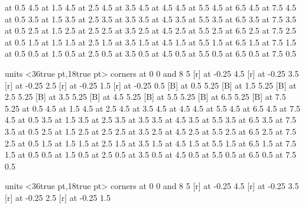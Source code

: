  at 0.5 4.5
 at 1.5 4.5
 at 2.5 4.5
 at 3.5 4.5
 at 4.5 4.5
 at 5.5 4.5
 at 6.5 4.5
 at 7.5 4.5
 at 0.5 3.5
 at 1.5 3.5
 at 2.5 3.5
 at 3.5 3.5
 at 4.5 3.5
 at 5.5 3.5
 at 6.5 3.5
 at 7.5 3.5
 at 0.5 2.5
 at 1.5 2.5
 at 2.5 2.5
 at 3.5 2.5
 at 4.5 2.5
 at 5.5 2.5
 at 6.5 2.5
 at 7.5 2.5
 at 0.5 1.5
 at 1.5 1.5
 at 2.5 1.5
 at 3.5 1.5
 at 4.5 1.5
 at 5.5 1.5
 at 6.5 1.5
 at 7.5 1.5
 at 0.5 0.5
 at 1.5 0.5
 at 2.5 0.5
 at 3.5 0.5
 at 4.5 0.5
 at 5.5 0.5
 at 6.5 0.5
 at 7.5 0.5
\endpicture
\bigskip

\beginpicture
\setcoordinatesystem units <36true pt,18true pt>
\putrectangle corners at 0 0 and 8 5
 [r] at -0.25 4.5
 [r] at -0.25 3.5
 [r] at -0.25 2.5
 [r] at -0.25 1.5
 [r] at -0.25 0.5
 [B] at 0.5 5.25
 [B] at 1.5 5.25
 [B] at 2.5 5.25
 [B] at 3.5 5.25
 [B] at 4.5 5.25
 [B] at 5.5 5.25
 [B] at 6.5 5.25
 [B] at 7.5 5.25
 at 0.5 4.5
 at 1.5 4.5
 at 2.5 4.5
 at 3.5 4.5
 at 4.5 4.5
 at 5.5 4.5
 at 6.5 4.5
 at 7.5 4.5
 at 0.5 3.5
 at 1.5 3.5
 at 2.5 3.5
 at 3.5 3.5
 at 4.5 3.5
 at 5.5 3.5
 at 6.5 3.5
 at 7.5 3.5
 at 0.5 2.5
 at 1.5 2.5
 at 2.5 2.5
 at 3.5 2.5
 at 4.5 2.5
 at 5.5 2.5
 at 6.5 2.5
 at 7.5 2.5
 at 0.5 1.5
 at 1.5 1.5
 at 2.5 1.5
 at 3.5 1.5
 at 4.5 1.5
 at 5.5 1.5
 at 6.5 1.5
 at 7.5 1.5
 at 0.5 0.5
 at 1.5 0.5
 at 2.5 0.5
 at 3.5 0.5
 at 4.5 0.5
 at 5.5 0.5
 at 6.5 0.5
 at 7.5 0.5
\endpicture
\bigskip

\beginpicture
\setcoordinatesystem units <36true pt,18true pt>
\putrectangle corners at 0 0 and 8 5
 [r] at -0.25 4.5
 [r] at -0.25 3.5
 [r] at -0.25 2.5
 [r] at -0.25 1.5

